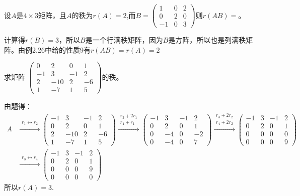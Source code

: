 \documentclass[a4paper]{report}
\begin{document}
\EX 设$A$是$4\times 3$矩阵，且$A$的秩为$r(A)=2$,而$B=
\begin{pmatrix}
1&0&2\\
0&2&0\\
-1&0&3
\end{pmatrix}
$则$r(AB)=$\underline{\hphantom{~~~~~~~}}。

\begin{jie}
计算得$r(B)=3$，所以$B$是一个行满秩矩阵，因为$B$是方阵，所以也是列满秩矩阵。由例2.26中给的性质9有$r(AB)=r(A)=2$
\end{jie}

\EX 求矩阵
$
\begin{pmatrix}
0&2&0&1\\ -1&3&-1&2\\ 2&-10&2&-6\\ 1&-7&1&5
\end{pmatrix}
$的秩。

\begin{jie}
由题得：
\begin{align*}
A&\xrightarrow{\substack{r_{1}\leftrightarrow r_2}}{
\begin{pmatrix}
-1&3&-1&2\\ 0&2&0&1\\ 2&-10&2&-6\\ 1&-7&1&5
\end{pmatrix}
}\xrightarrow{\substack{r_{3}+2r_1 \\ r_4+r_1}}{
\begin{pmatrix}
-1&3&-1&2\\ 0&2&0&1\\ 0&-4&0&-2\\ 0&-4&0&7
\end{pmatrix}
}\xrightarrow{\substack{r_{3}+2r_2 \\ r_4+2r_2}}{
\begin{pmatrix}
-1&3&-1&2\\ 0&2&0&1\\ 0&0&0&0\\ 0&0&0&9
\end{pmatrix}
}\\
&\xrightarrow{\substack{r_{3}\leftrightarrow r_4}}{
\begin{pmatrix}
-1&3&-1&2\\ 0&2&0&1\\  0&0&0&9\\0&0&0&0
\end{pmatrix}
}
\end{align*}
所以$r(A)=3$.
\end{jie}
\end{document}
